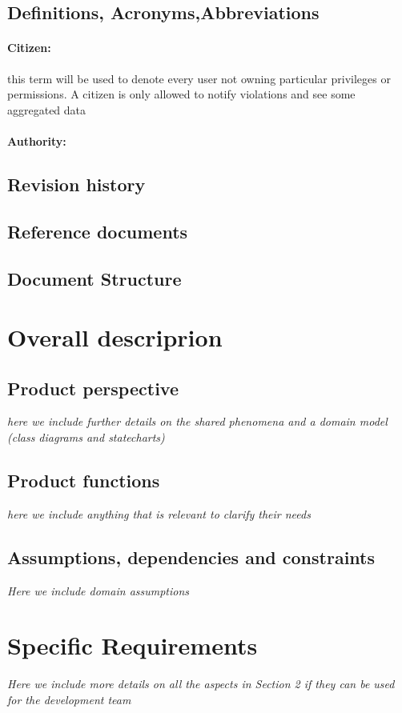 \documentclass{article}
\begin{document}
	\subsection{Definitions, Acronyms,Abbreviations}
		\paragraph{Citizen:} this term will be used to denote every user not owning particular privileges or permissions. A citizen is only allowed to notify violations and see some aggregated data
		\paragraph{Authority:} %
	\subsection{Revision history}
	\subsection{Reference documents}
	\subsection{Document Structure}
\section{Overall descriprion}
	\subsection{Product perspective} \textit{here we include further details on the shared phenomena and a domain model (class diagrams and statecharts)}
	\subsection{Product functions}\textit{here we include anything that is relevant to clarify their needs}
	\subsection{Assumptions, dependencies and constraints} \textit{Here we include domain assumptions}
\section{Specific Requirements} \textit{Here we include more details on all the aspects in Section 2 if they can be used for the development team}
\end{document}
